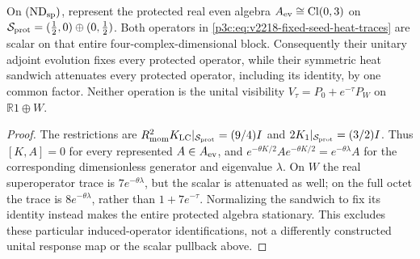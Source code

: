 \documentclass[12pt,a4paper]{article}
\begin{document}
\begin{proposition}
\label{p3c:prop:v2218-protected-heat-commutant}
On \((\mathrm{ND}_{\rm sp})\), represent the protected real even
algebra \(A_{\rm ev}\cong\operatorname{Cl}(0,3)\) on
\(\mathcal S_{\rm prot}=(\tfrac12,0)\oplus(0,\tfrac12)\).
Both operators in \eqref{p3c:eq:v2218-fixed-seed-heat-traces} are
scalar on that entire four-complex-dimensional block. Consequently
their unitary adjoint evolution fixes every protected operator, while
their symmetric heat sandwich attenuates every protected operator,
including its identity, by one common factor. Neither operation is the
unital visibility \(V_\tau=P_0+e^{-\tau}P_W\) on
\(\mathbb R1\oplus W\).
\end{proposition}
\begin{proof}
The restrictions are
\(R_{\mathrm{mom}}^2K_{\rm LC}|_{\mathcal S_{\rm prot}}=(9/4)I\) and
\(2K_1|_{\mathcal S_{\rm prot}}=(3/2)I\).
Thus \([K,A]=0\) for every represented \(A\in A_{\rm ev}\), and
\(e^{-\theta K/2}Ae^{-\theta K/2}=e^{-\theta\lambda}A\)
for the corresponding dimensionless generator and eigenvalue
\(\lambda\). On \(W\) the real superoperator trace is
\(7e^{-\theta\lambda}\), but the scalar is attenuated as well;
on the full octet the trace is \(8e^{-\theta\lambda}\), rather
than \(1+7e^{-\tau}\). Normalizing the sandwich to fix its identity
instead makes the entire protected algebra stationary. This excludes
these particular induced-operator identifications, not a differently
constructed unital response map or the scalar pullback above.
\end{proof}
\end{document}
